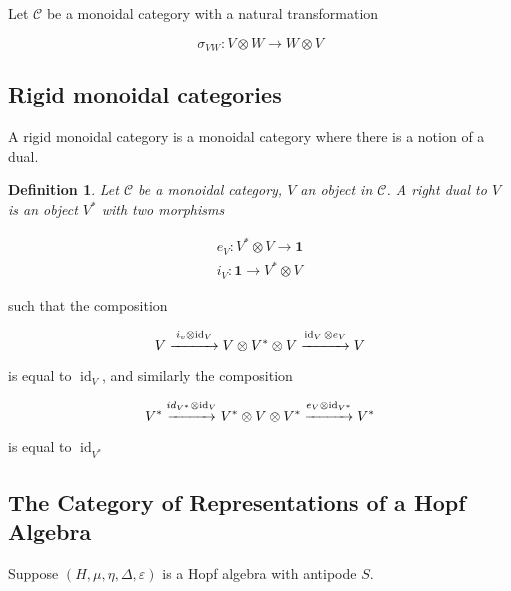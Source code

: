 \documentclass[]{article}
\newtheorem{defn}[theorem]{Definition}
\newcommand{\id}{\operatorname{id}}
\numberwithin{equation}{subsection}
\begin{document}
Let $\mathcal{C}$ be a monoidal category with a natural transformation 

\begin{equation}
    \sigma_{VW} : V \otimes W \to W \otimes V
\end{equation}

\subsection{Rigid monoidal categories}
A rigid monoidal category is a monoidal category where there is a notion of a dual. 

\begin{defn}
    Let $\mathcal{C}$ be a monoidal category, $V$ an object in $\mathcal{C}$. A \emph{right dual} to $V$ is an object $V^*$ with two morphisms

    \begin{align}
        e_V: V^* \otimes V \to \mathbf{1}  \\
        i_V: \mathbf{1} \to V^* \otimes V
    \end{align}
\end{defn}

such that the composition

\begin{equation}
    V \stackrel{i_v \otimes \id_V}{\xrightarrow{\hspace*{1cm}}} V \otimes V^*
    \otimes V  \stackrel{\id_V \otimes e_V}{\xrightarrow{\hspace*{1cm}}} V
\end{equation}

is equal to $\id_V$, and similarly the composition

\begin{equation}
    V^* \stackrel{id_{V^*} \otimes \id_V}{\xrightarrow{\hspace*{1cm}}} V^*
    \otimes V \otimes V^*  \stackrel{e_V \otimes
    \id_{V^*}}{\xrightarrow{\hspace*{1cm}}} V^*
\end{equation}

is equal to $\id_{V^*}$


\subsection{The Category of Representations of a Hopf Algebra}

Suppose $(H, \mu, \eta, \Delta, \varepsilon)$ is a Hopf algebra with antipode $S$. 
\end{document}
